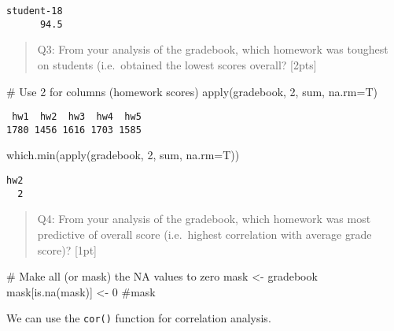 \documentclass[
  letterpaper,
  DIV=11,
  numbers=noendperiod]{scrartcl}
\newenvironment{Shaded}{\begin{snugshade}}{\end{snugshade}}
\newcommand{\AttributeTok}[1]{\textcolor[rgb]{0.40,0.45,0.13}{#1}}
\newcommand{\CommentTok}[1]{\textcolor[rgb]{0.37,0.37,0.37}{#1}}
\newcommand{\DecValTok}[1]{\textcolor[rgb]{0.68,0.00,0.00}{#1}}
\newcommand{\FunctionTok}[1]{\textcolor[rgb]{0.28,0.35,0.67}{#1}}
\newcommand{\NormalTok}[1]{\textcolor[rgb]{0.00,0.23,0.31}{#1}}
\newcommand{\OtherTok}[1]{\textcolor[rgb]{0.00,0.23,0.31}{#1}}
\newcommand{\SpecialCharTok}[1]{\textcolor[rgb]{0.37,0.37,0.37}{#1}}
\begin{document}
\begin{verbatim}
student-18 
      94.5 
\end{verbatim}

\begin{quote}
Q3: From your analysis of the gradebook, which homework was toughest on
students (i.e.~obtained the lowest scores overall? {[}2pts{]}
\end{quote}

\begin{Shaded}
\begin{Highlighting}[]
\CommentTok{\# Use 2 for columns (homework scores)}
\FunctionTok{apply}\NormalTok{(gradebook, }\DecValTok{2}\NormalTok{, sum, }\AttributeTok{na.rm=}\NormalTok{T)}
\end{Highlighting}
\end{Shaded}

\begin{verbatim}
 hw1  hw2  hw3  hw4  hw5 
1780 1456 1616 1703 1585 
\end{verbatim}

\begin{Shaded}
\begin{Highlighting}[]
\FunctionTok{which.min}\NormalTok{(}\FunctionTok{apply}\NormalTok{(gradebook, }\DecValTok{2}\NormalTok{, sum, }\AttributeTok{na.rm=}\NormalTok{T))}
\end{Highlighting}
\end{Shaded}

\begin{verbatim}
hw2 
  2 
\end{verbatim}

\begin{quote}
Q4: From your analysis of the gradebook, which homework was most
predictive of overall score (i.e.~highest correlation with average grade
score)? {[}1pt{]}
\end{quote}

\begin{Shaded}
\begin{Highlighting}[]
\CommentTok{\# Make all (or mask) the NA values to zero}
\NormalTok{mask }\OtherTok{\textless{}{-}}\NormalTok{ gradebook}
\NormalTok{mask[}\FunctionTok{is.na}\NormalTok{(mask)] }\OtherTok{\textless{}{-}} \DecValTok{0}
\CommentTok{\#mask}
\end{Highlighting}
\end{Shaded}

We can use the \texttt{cor()} function for correlation analysis.

\begin{Shaded}
\end{Shaded}
\end{document}
